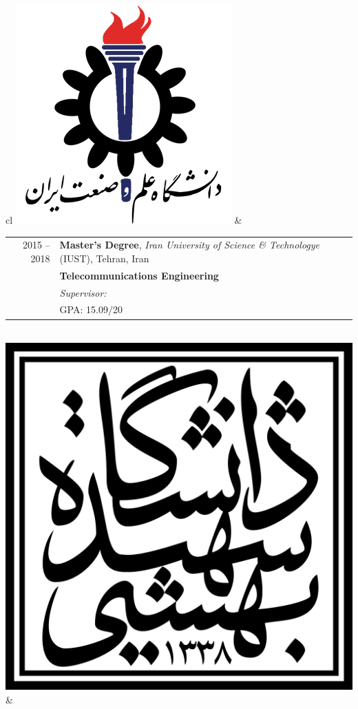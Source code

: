 
\begin{tabular}{cl}
	\includegraphics[scale=0.12]{graphics/IUST_logo_color} &
	\begin{tabular}{rl}
		\textsc{2015 --2018} & \textbf{Master’s Degree},  \emph{Iran University of Science \& Technologye} (IUST),  Tehran, Iran            \\
		                     & \textbf{Telecommunications Engineering}                                                                      \\
		                     & \emph{Supervisor:\link{http://www.iust.ac.ir/content/45110/Dr.-Haddadi}{Assistant Professor Farzan Haddadi}} \\
		                     & \textsc{GPA}: 15.09/20                                                                                       \\
	\end{tabular}
	\\
	\includegraphics[scale=0.05]{graphics/SBU_logo}        &

\end{tabular}
